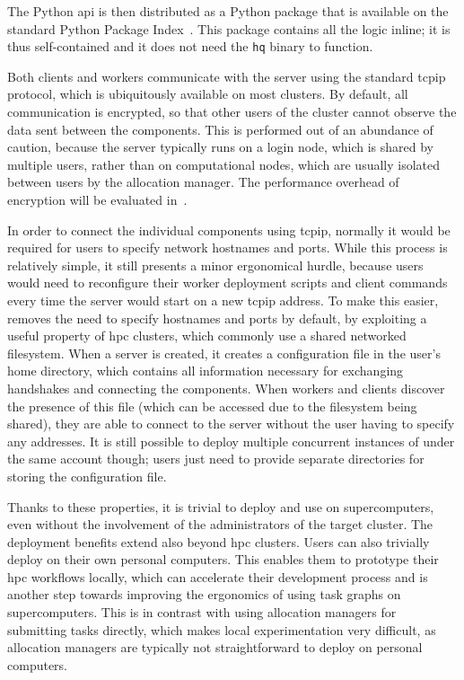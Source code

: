 The \hyperqueue{} Python \gls{api} is then distributed as a Python package
that is available on the standard Python Package Index~\cite{hq_pypi}. This package
contains all the \hq{} logic inline; it is thus self-contained and it does not
need the \texttt{hq} binary to function.

Both clients and workers communicate with the server using the standard \gls{tcpip}
protocol, which is ubiquitously available on most clusters. By default, all communication is
encrypted, so that other users of the cluster cannot observe the data sent between the
\hyperqueue{} components. This is performed out of an abundance of caution, because the
server typically runs on a login node, which is shared by multiple users, rather than on
computational nodes, which are usually isolated between users by the allocation manager. The
performance overhead of encryption will be evaluated in~.

In order to connect the individual components using \gls{tcpip}, normally it would be
required for users to specify network hostnames and ports. While this process is relatively simple,
it still presents a minor ergonomical hurdle, because users would need to reconfigure their worker
deployment scripts and client commands every time the server would start on a new
\gls{tcpip} address. To make this easier, \hyperqueue{} removes the need to
specify hostnames and ports by default, by exploiting a useful property of \gls{hpc}
clusters, which commonly use a shared networked filesystem. When a server is created, it creates a
configuration file in the user's home directory, which contains all information necessary for
exchanging handshakes and connecting the components. When workers and clients discover the presence
of this file (which can be accessed due to the filesystem being shared), they are able to connect
to the server without the user having to specify any addresses. It is still possible to deploy
multiple concurrent instances of \hyperqueue{} under the same account though; users just
need to provide separate directories for storing the configuration file.

Thanks to these properties, it is trivial to deploy and use \hyperqueue{} on
supercomputers, even without the involvement of the administrators of the target cluster. The
deployment benefits extend also beyond \gls{hpc} clusters. Users can also trivially
deploy \hyperqueue{} on their own personal computers. This enables them to prototype
their \gls{hpc} workflows locally, which can accelerate their development process and
is another step towards improving the ergonomics of using task graphs on supercomputers. This is in
contrast with using allocation managers for submitting tasks directly, which makes local
experimentation very difficult, as allocation managers are typically not straightforward to deploy
on personal computers.

